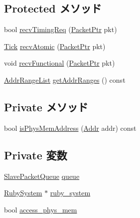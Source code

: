 \subsection*{Protected メソッド}
\begin{DoxyCompactItemize}
\item 
bool \hyperlink{classRubyPort_1_1MemSlavePort_a3344d9dd0f83257feab5424e761f31c6}{recvTimingReq} (\hyperlink{classPacket}{PacketPtr} pkt)
\item 
\hyperlink{base_2types_8hh_a5c8ed81b7d238c9083e1037ba6d61643}{Tick} \hyperlink{classRubyPort_1_1MemSlavePort_a5f0b4c4a94f6b0053f9d7a4eb9c2518a}{recvAtomic} (\hyperlink{classPacket}{PacketPtr} pkt)
\item 
void \hyperlink{classRubyPort_1_1MemSlavePort_aeefa907fb6d6a787e6dab90e8138ea90}{recvFunctional} (\hyperlink{classPacket}{PacketPtr} pkt)
\item 
\hyperlink{classstd_1_1list}{AddrRangeList} \hyperlink{classRubyPort_1_1MemSlavePort_a36cf113d5e5e091ebddb32306c098fae}{getAddrRanges} () const 
\end{DoxyCompactItemize}
\subsection*{Private メソッド}
\begin{DoxyCompactItemize}
\item 
bool \hyperlink{classRubyPort_1_1MemSlavePort_aa1da2f433965694958a83f76fcf4adc2}{isPhysMemAddress} (\hyperlink{base_2types_8hh_af1bb03d6a4ee096394a6749f0a169232}{Addr} addr) const 
\end{DoxyCompactItemize}
\subsection*{Private 変数}
\begin{DoxyCompactItemize}
\item 
\hyperlink{classSlavePacketQueue}{SlavePacketQueue} \hyperlink{classRubyPort_1_1MemSlavePort_a3055168363a9ed42f38173363b6c1975}{queue}
\item 
\hyperlink{classRubySystem}{RubySystem} $\ast$ \hyperlink{classRubyPort_1_1MemSlavePort_a88928242e9a532cb6f4abe42dd8240a7}{ruby\_\-system}
\item 
bool \hyperlink{classRubyPort_1_1MemSlavePort_a5925f629d4ec58811bba7c4fa6b4d64d}{access\_\-phys\_\-mem}
\end{DoxyCompactItemize}



